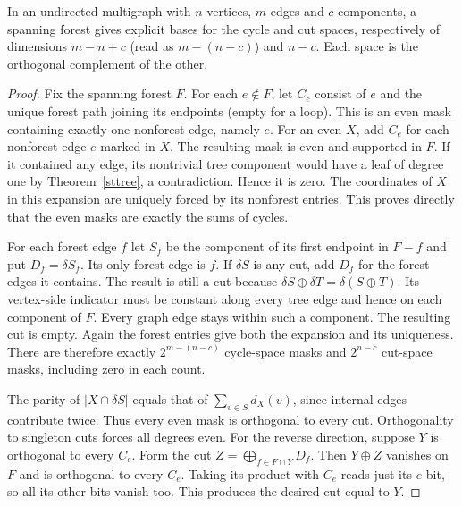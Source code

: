 \begin{theorem}\leavevmode\label{stbases}
In an undirected multigraph with $n$ vertices, $m$ edges and $c$ components, a spanning forest gives explicit bases for the cycle and cut spaces, respectively of dimensions $m-n+c$ (read as $m-(n-c)$) and $n-c$. Each space is the orthogonal complement of the other.
\end{theorem}
\begin{proof}
Fix the spanning forest $F$. For each $e\notin F$, let $C_e$ consist of $e$ and the unique forest path joining its endpoints (empty for a loop). This is an even mask containing exactly one nonforest edge, namely $e$. For an even $X$, add $C_e$ for each nonforest edge $e$ marked in $X$. The resulting mask is even and supported in $F$. If it contained any edge, its nontrivial tree component would have a leaf of degree one by Theorem~\ref{sttree}, a contradiction. Hence it is zero. The coordinates of $X$ in this expansion are uniquely forced by its nonforest entries. This proves directly that the even masks are exactly the sums of cycles.

For each forest edge $f$ let $S_f$ be the component of its first endpoint in $F-f$ and put $D_f=\delta S_f$. Its only forest edge is $f$. If $\delta S$ is any cut, add $D_f$ for the forest edges it contains. The result is still a cut because $\delta S\oplus\delta T=\delta(S\oplus T)$. Its vertex-side indicator must be constant along every tree edge and hence on each component of $F$. Every graph edge stays within such a component. The resulting cut is empty. Again the forest entries give both the expansion and its uniqueness. There are therefore exactly $2^{m-(n-c)}$ cycle-space masks and $2^{n-c}$ cut-space masks, including zero in each count.

The parity of $|X\cap\delta S|$ equals that of $\sum_{v\in S} d_X(v)$, since internal edges contribute twice. Thus every even mask is orthogonal to every cut. Orthogonality to singleton cuts forces all degrees even. For the reverse direction, suppose $Y$ is orthogonal to every $C_e$. Form the cut $Z=\bigoplus_{f\in F\cap Y}D_f$. Then $Y\oplus Z$ vanishes on $F$ and is orthogonal to every $C_e$. Taking its product with $C_e$ reads just its $e$-bit, so all its other bits vanish too. This produces the desired cut equal to $Y$.
\end{proof}

